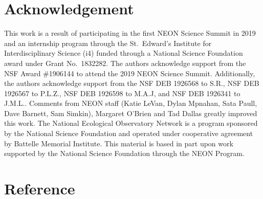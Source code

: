 \documentclass[
  12pt,
]{article}
\begin{document}
\hypertarget{acknowledgement}{%
\section{Acknowledgement}\label{acknowledgement}}

This work is a result of participating in the first NEON Science Summit in 2019 and an internship program through the St.~Edward's Institute for Interdisciplinary Science (i4) funded through a National Science Foundation award under Grant No.~1832282. The authors acknowledge support from the NSF Award \#1906144 to attend the 2019 NEON Science Summit. Additionally, the authors acknowledge support from the NSF DEB 1926568 to S.R., NSF DEB 1926567 to P.L.Z., NSF DEB 1926598 to M.A.J, and NSF DEB 1926341 to J.M.L.. Comments from NEON staff (Katie LeVan, Dylan Mpnahan, Sata Paull, Dave Barnett, Sam Simkin), Margaret O'Brien and Tad Dallas greatly improved this work. The National Ecological Observatory Network is a program sponsored by the National Science Foundation and operated under cooperative agreement by Battelle Memorial Institute. This material is based in part upon work supported by the National Science Foundation through the NEON Program.

\hypertarget{reference}{%
\section*{Reference}\label{reference}}
\end{document}
